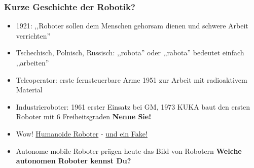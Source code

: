 \documentclass{beamer}
\begin{document}



\begin{frame}
\frametitle{Kurze Geschichte der Robotik?}
\begin{itemize}
\item 1921: ,,Roboter sollen dem Menschen gehorsam dienen und schwere Arbeit verrichten''
\item Tschechisch, Polnisch, Russisch: ,,robota'' oder ,,rabota'' bedeutet einfach ,,arbeiten'' 
\item Teleoperator: erste fernsteuerbare Arme 1951 zur Arbeit mit radioaktivem Material
\item Industrieroboter: 1961 erster Einsatz bei GM, 1973 KUKA baut den ersten Roboter mit 6 Freiheitsgraden \textbf{Nenne Sie!}
\item Wow! \href{https://www.youtube.com/watch?v=_sBBaNYex3E}{Humanoide Roboter} - \href{https://youtu.be/dKjCWfuvYxQ?list=PLByDuMFhvvr77bbMhXFQ73Km0BddpccQN}{und ein Fake!}
\item Autonome mobile Roboter prägen heute das Bild von Robotern \textbf{Welche autonomen Roboter kennst Du?}
\end{itemize}
\end{frame}
\end{document}
